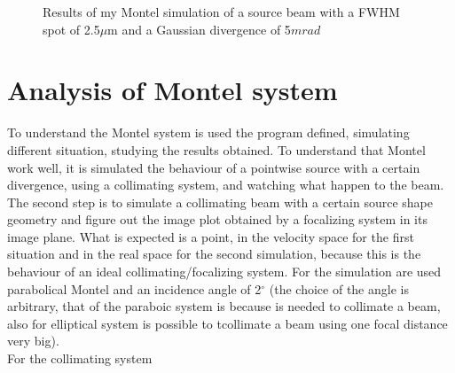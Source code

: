 \begin{figure}[H]
%
\centering
%
\quad
%
%
\caption{Results of  my Montel simulation of a source beam with a FWHM spot of 2.5$\mu $m and a Gaussian divergence of 5$mrad $}
%
\label{fig: My Simulation Comparison}
%
\end{figure}

\section{Analysis of Montel system}
To understand the Montel system is used the program defined, simulating different situation, studying the results obtained. To understand that Montel work well, it is simulated the behaviour of a pointwise source with a certain divergence, using a collimating system, and watching what happen to the beam. The  second step is to simulate a collimating beam with a certain source shape geometry and figure out the image plot obtained by a focalizing system in its image plane. What is expected is a point, in the velocity space for the first situation and in the real space for the second simulation, because this is the behaviour of an ideal collimating/focalizing system. For the simulation are used parabolical Montel and an incidence angle of 2$^{\circ} $ (the choice of the angle is arbitrary, that of the paraboic system is because is needed to collimate a beam, also for elliptical system is possible to tcollimate a beam using one focal distance very big).
\\
For the collimating system 


